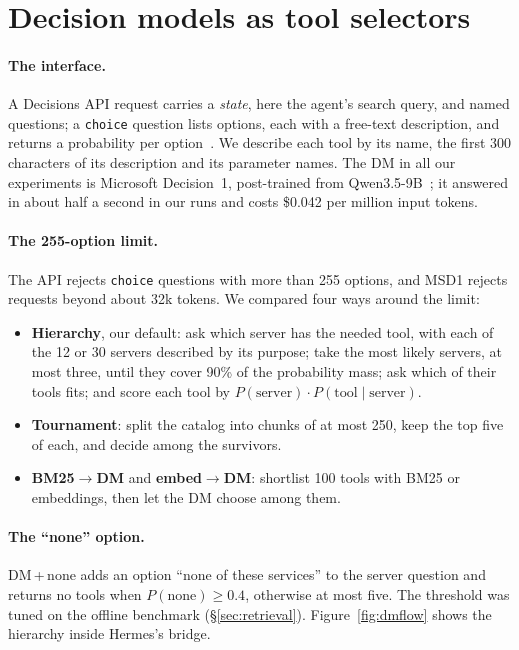 \documentclass[11pt]{article}
\newcommand{\msd}{MSD1}
\newcommand{\dmn}{DM\,+\,none}
\begin{document}
\section{Decision models as tool selectors}\label{sec:dm}
\paragraph{The interface.} A Decisions API request carries a \emph{state}, here the agent's search query, and
named questions; a \texttt{choice} question lists options, each with a free-text description, and returns a
probability per option~\citep{openrouterdecisions}. We describe each tool by its name, the first 300 characters
of its description and its parameter names. The DM in all our experiments is Microsoft Decision~1, post-trained
from Qwen3.5-9B~\citep{msd1}; it answered in about half a second in our runs and costs \$0.042 per million input
tokens.

\paragraph{The 255-option limit.} The API rejects \texttt{choice} questions with more than 255 options, and
\msd{} rejects requests beyond about 32k tokens. We compared four ways around the limit:
\begin{itemize}
\item \textbf{Hierarchy}, our default: ask which server has the needed tool, with each of the 12 or 30 servers
described by its purpose; take the most likely servers, at most three, until they cover 90\% of the probability
mass; ask which of their tools fits; and score each tool by
$P(\text{server})\cdot P(\text{tool}\mid\text{server})$.
\item \textbf{Tournament}: split the catalog into chunks of at most 250, keep the top five of each, and decide
among the survivors.
\item \textbf{BM25$\to$DM} and \textbf{embed$\to$DM}: shortlist 100 tools with BM25 or embeddings, then let the
DM choose among them.
\end{itemize}

\paragraph{The ``none'' option.} \dmn{} adds an option ``none of these services'' to the server question and
returns no tools when $P(\text{none})\ge0.4$, otherwise at most five. The threshold was tuned on the offline
benchmark (\S\ref{sec:retrieval}). Figure~\ref{fig:dmflow} shows the hierarchy inside Hermes's bridge.
\end{document}
